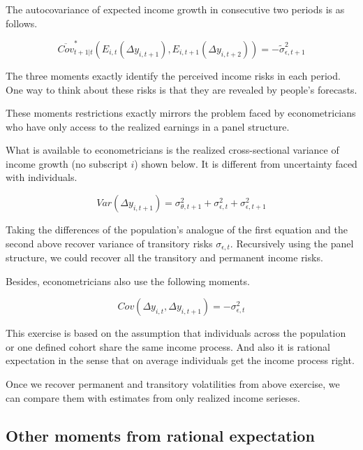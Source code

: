 \documentclass[12pt,notitlepage,onecolumn,aps,pra]{article}
\begin{document}
The autocovariance of expected income growth in consecutive two periods
is as follows.

\begin{equation}
\overline {Cov}^*_{t+1|t}(E_{i,t}(\Delta y_{i,t+1}),E_{i,t+1}(\Delta y_{i,t+2}) ) = - \tilde \sigma^2_{\epsilon,t+1}
\end{equation}

The three moments exactly identify the perceived income risks in each
period. One way to think about these risks is that they are revealed by
people's forecasts.

These moments restrictions exactly mirrors the problem faced by
econometricians who have only access to the realized earnings in a panel
structure.

What is available to econometricians is the realized cross-sectional
variance of income growth (no subscript \(i\)) shown below. It is
different from uncertainty faced with individuals.

\begin{equation}
Var (\Delta y_{i,t+1}) =  \sigma^2_{\theta,t+1} +\sigma^2_{\epsilon,t}+ \sigma^2_{\epsilon,t+1}
\end{equation}

Taking the differences of the population's analogue of the first
equation and the second above recover variance of transitory risks
\(\sigma_{\epsilon,t}\). Recursively using the panel structure, we could
recover all the transitory and permanent income risks.

Besides, econometricians also use the following moments.

\begin{equation}
Cov (\Delta y_{i,t}, \Delta y_{i,t+1}) =  -\sigma^2_{\epsilon,t}
\end{equation}

This exercise is based on the assumption that individuals across the
population or one defined cohort share the same income process. And also
it is rational expectation in the sense that on average individuals get
the income process right.

Once we recover permanent and transitory volatilities from above
exercise, we can compare them with estimates from only realized income
serieses.

\hypertarget{other-moments-from-rational-expectation}{%
\subsection{Other moments from rational
expectation}\label{other-moments-from-rational-expectation}}
\end{document}
